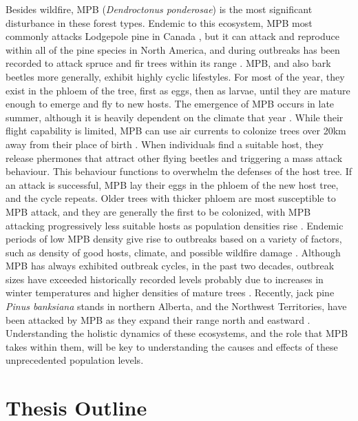 Besides wildfire, MPB (\textit{Dendroctonus ponderosae}) is the most significant disturbance in these forest types. Endemic to this ecosystem, MPB most commonly attacks Lodgepole pine in Canada \cite{safranyik2007mountain}, but it can attack and reproduce within all of the pine species in North America, and during outbreaks has been recorded to attack spruce and fir trees within its range \cite{gibson2009mountain}. MPB, and also bark beetles more generally, exhibit highly cyclic lifestyles. For most of the year, they exist in the phloem of the tree, first as eggs, then as larvae, until they are mature enough to emerge and fly to new hosts. The emergence of MPB occurs in late summer, although it is heavily dependent on the climate that year \cite{bentz2014mountain}. While their flight capability is limited, MPB can use air currents to colonize trees over 20km away from their place of birth \cite{shegelski2019morphological}. When individuals find a suitable host, they release phermones that attract other flying beetles and triggering a mass attack behaviour. This behaviour functions to overwhelm the defenses of the host tree. If an attack is successful, MPB lay their eggs in the phloem of the new host tree, and the cycle repeats. Older trees with thicker phloem are most susceptible to MPB attack, and they are generally the first to be colonized, with MPB attacking progressively less suitable hosts as population densities rise \cite{safranyik2007mountain}. Endemic periods of low MPB density give rise to outbreaks based on a variety of factors, such as density of good hosts, climate, and possible wildfire damage \cite{safranyik2007mountain}. Although MPB has always exhibited outbreak cycles, in the past two decades, outbreak sizes have exceeded historically recorded levels probably due to increases in winter temperatures and higher densities of mature trees \cite{bentz2010climate,safranyik2007mountain}. Recently, jack pine \textit{Pinus banksiana} stands in northern Alberta, and the Northwest Territories, have been attacked by MPB as they expand their range north and eastward \cite{cudmore2010climate,nrcanmpb}. Understanding the holistic dynamics of these ecosystems, and the role that MPB takes within them, will be key to understanding the causes and effects of these unprecedented population levels. 

\section{Thesis Outline}

